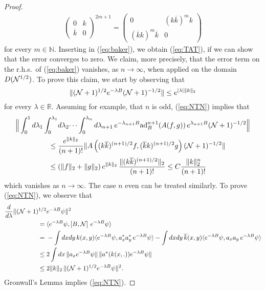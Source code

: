 \documentclass[11pt,a4paper]{article}
\newcommand{\done}{}
\newcommand{\bR}{{\mathbb R}}
\newcommand{\bN}{{\mathbb N}}
\newcommand{\cN}{{\cal N}}
\begin{document}
\begin{proof}
\[\begin{split}
\left(  \begin{array}{ll} 0 &  k  \\ \overline{k} & 0 \end{array} \right)^{2m+1} = \left(  \begin{array}{ll} 0 & (k \overline{k})^m k \\  (\overline{k} k)^m \overline{k} & 0 \end{array} \right) 
\end{split} \]
for every $m \in \bN$. Inserting in (\ref{eq:baker}), we obtain (\ref{eq:TAT}), if we can show that 
the error converges to zero. We claim, more precisely, that the error term on the r.h.s.\ of (\ref{eq:baker}) vanishes, as $n \to \infty$, when applied on the domain $D(\cN^{1/2})$. 
To prove this claim, we start by observing that
\begin{equation}\label{eq:NTN} \| (\cN+1)^{1/2} e^{-\lambda B} (\cN+1)^{-1/2} \|%
\leq e^{|\lambda| \| k \|_2} \end{equation}
for every $\lambda \in \bR$. Assuming for example, that $n$ is odd, (\ref{eq:NTN}) implies that 
\[ \begin{split} \Big\| \int_0^1 d\lambda_1 \int_0^{\lambda_1} &d\lambda_2 \dots \int_0^{\lambda_{n}} d\lambda_{n+1} \, e^{-\lambda_{n+1} B}  \text{ad}_B^{n+1} (A (f,g)) \, e^{\lambda_{n+1} B} (\cN +1)^{-1/2} \Big\| \\ \leq \; & \frac{e^{\| k \|_2}}{(n+1)!}  \| A \left( (k\overline{k})^{(n+1)/2} f , (\overline{k} k)^{(n+1)/2} g \right) (\cN+1)^{-1/2} \| \\
\leq \; & (\| f \|_2 + \| g \|_2) \, e^{\| k \|_2} \, \frac{\| (k\overline{k})^{(n+1)/2} \|_2}{(n+1)!} \leq C \frac{\| k \|_2^n}{(n+1)!}\done 
\end{split}\]
which vanishes as $n \to \infty$. The case $n$ even can be treated similarly. To prove (\ref{eq:NTN}), we observe that 
\[ \begin{split} \frac{d}{d\lambda} \| (\cN+1)^{1/2} & e^{-\lambda B} \psi \|^2  \\
 =\; & \langle e^{-\lambda B} \psi, \left[ B , \cN \right] \, e^{-\lambda B} \psi \rangle \\
 = \; & -\int dx dy \,  k(x,y) \langle e^{-\lambda B} \psi, a_x^* a_y^* \, e^{-\lambda B} \psi \rangle - \int dx dy \, \overline{k} (x,y) \langle e^{-\lambda B} \psi, a_x a_y \, e^{-\lambda B} \psi \rangle \\ 
\leq \; & 2\int dx \, \| a_x e^{-\lambda B} \psi \| \, \| a^* (k(x,.)) e^{-\lambda B} \psi \| \\ 
\leq \; &2 \| k \|_2 \,  \| (\cN+1)^{1/2} e^{-\lambda B} \psi \|^2.
\end{split} \]
Gronwall's Lemma implies (\ref{eq:NTN}).   


\end{proof}
\end{document}

